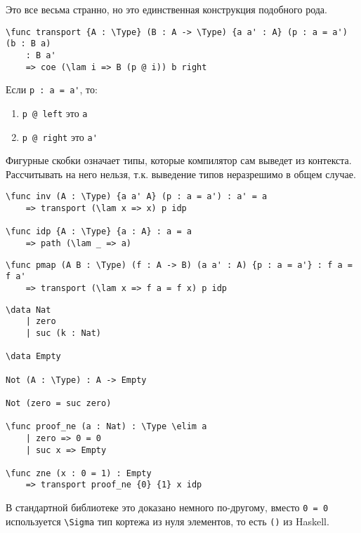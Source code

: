 Это все весьма странно, но это единственная конструкция подобного рода.

\begin{verbatim}
\func transport {A : \Type} (B : A -> \Type) {a a' : A} (p : a = a') (b : B a)
    : B a'
    => coe (\lam i => B (p @ i)) b right
\end{verbatim}

\begin{notation}
    Если \verb!p : a = a'!, то:
    \begin{enumerate}
        \item \verb!p @ left! это \verb!a!
        \item \verb!p @ right! это \verb!a'!
    \end{enumerate}
\end{notation}

\begin{remark}
    Фигурные скобки означает типы, которые компилятор сам выведет из контекста. Рассчитывать на него нельзя, т.к. выведение типов неразрешимо в общем случае.
\end{remark}

\begin{example}\itemfix
    \begin{verbatim}
\func inv (A : \Type) {a a' A} (p : a = a') : a' = a
    => transport (\lam x => x) p idp

\func idp {A : \Type} {a : A} : a = a
    => path (\lam _ => a)
        \end{verbatim}
\end{example}

\begin{example}[конгруэнтность]\itemfix
    \begin{verbatim}
\func pmap (A B : \Type) (f : A -> B) (a a' : A) {p : a = a'} : f a = f a'
    => transport (\lam x => f a = f x) p idp
    \end{verbatim}
\end{example}

\begin{example}\itemfix
    \begin{verbatim}
\data Nat
    | zero
    | suc (k : Nat)
    
\data Empty

Not (A : \Type) : A -> Empty

Not (zero = suc zero)

\func proof_ne (a : Nat) : \Type \elim a
    | zero => 0 = 0
    | suc x => Empty
    
\func zne (x : 0 = 1) : Empty
    => transport proof_ne {0} {1} x idp
    \end{verbatim}
\end{example}

\begin{remark}
    В стандартной библиотеке это доказано немного по-другому, вместо \verb!0 = 0! используется \verb!\Sigma! тип кортежа из нуля элементов, то есть \verb!()! из Haskell.
\end{remark}
